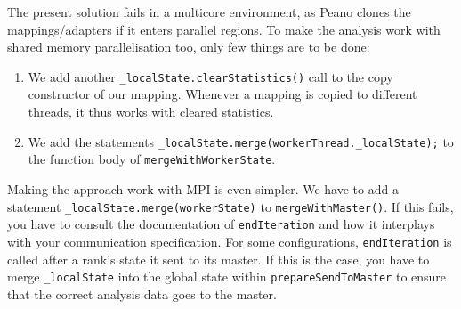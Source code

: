 The present solution fails in a multicore environment, as Peano clones the
mappings/adapters if it enters parallel regions. To make the analysis work with
shared memory parallelisation too, only few things are to be done:
\begin{enumerate}
  \item We add another \texttt{\_localState.clearStatistics()} call to the copy
  constructor of our mapping. Whenever a mapping is copied to different threads,
  it thus works with cleared statistics.
  \item We add the statements
  \texttt{\_localState.merge(workerThread.\_localState);} to the function body
  of \texttt{mergeWithWorkerState}.
\end{enumerate}


Making the approach work with MPI is even simpler. We have to add a statement
\linebreak
\texttt{\_localState.merge(workerState)}
to \texttt{mergeWithMaster()}. If this fails, you have to consult the
documentation of \texttt{endIteration} and how it interplays with your
communication specification. For some configurations, \texttt{endIteration} is
called after a rank's state it sent to its master. If this is the case, you have
to merge \texttt{\_localState} into the global state within
\texttt{prepareSendToMaster} to ensure that the correct analysis data goes to
the master.
